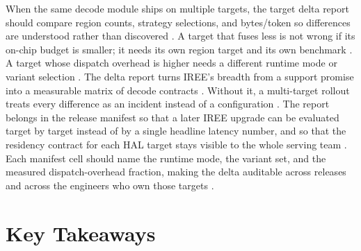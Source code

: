 When the same decode module ships on multiple targets, the target delta report should compare region counts, strategy selections, and bytes/token so differences are understood rather than discovered \citep{iree2024,memoryfloor2026}. A target that fuses less is not wrong if its on-chip budget is smaller; it needs its own region target and its own benchmark \citep{amd2024xdna,chen2020compilerbasedhardw}. A target whose dispatch overhead is higher needs a different runtime mode or variant selection \citep{iree2024,patel2025llminference}. The delta report turns IREE's breadth from a support promise into a measurable matrix of decode contracts \citep{taxbreak2026,memoryfloor2026}. Without it, a multi-target rollout treats every difference as an incident instead of a configuration \citep{patel2025llminference,iree2024}.
The report belongs in the release manifest so that a later IREE upgrade can be evaluated target by target instead of by a single headline latency number, and so that the residency contract for each HAL target stays visible to the whole serving team \citep{iree2024,memoryfloor2026}.
Each manifest cell should name the runtime mode, the variant set, and the measured dispatch-overhead fraction, making the delta auditable across releases and across the engineers who own those targets \citep{iree2024,patel2025llminference}.

\section{Key Takeaways}
\label{sec:ch18_key_takeaways}

